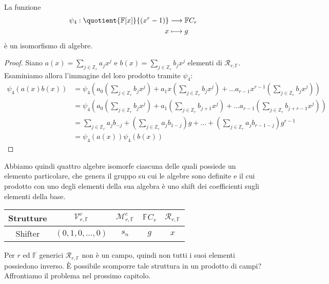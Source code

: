\begin{prop}
La funzione
\begin{align*}
\psi_{4}: \quotient{ \mathbb{F}[x] }{ (x^r -1 )} 
          &\longrightarrow  
          \mathbb{F}C_{r} \\
              x 
              &\longmapsto 
              g
\end{align*}
è un isomorfismo di algebre.
\end{prop}

\begin{proof}
Siano $a(x) = \sum_{j \in \mathbb{Z}_{r} }a_{j} x^{j}$ e $b(x)= \sum_{j \in
\mathbb{Z}_{r} } b_{j} x^{j}$ elementi di $\mathcal{R}_{r, \mathbb{F}} $.
Esaminiamo allora l'immagine del loro prodotto tramite $\psi_{4}$:
\begin{align*}
\psi_{4}(a(x)b(x)) 
&= \psi_{4}( 
a_{0}(\sum_{j \in \mathbb{Z}_{r} } b_{j} x^{j}) +  
a_{1}x(\sum_{j \in \mathbb{Z}_{r} } b_{j} x^{j}) +
\dots
a_{r-1}x^{r-1}(\sum_{j \in \mathbb{Z}_{r} } b_{j} x^{j})
)
\\
&= 
\psi_{4}( 
a_{0}(\sum_{j \in \mathbb{Z}_{r} } b_{j} x^{j}) +  
a_{1}(\sum_{j \in \mathbb{Z}_{r} } b_{j+1} x^{j}) +
\dots
a_{r-1}(\sum_{j \in \mathbb{Z}_{r} } b_{j+r-1} x^{j})
) 
\\
&=
\sum_{j \in \mathbb{Z}_{r} } a_{j} b_{-j} +
(\sum_{j \in \mathbb{Z}_{r} } a_{j} b_{1-j})g +
\dots +
(\sum_{j \in \mathbb{Z}_{r} } a_{j} b_{r-1-j})g^{r-1}
\\
&=
\psi_{4}(a(x))\psi_{4}(b(x))
\end{align*}
\end{proof}

Abbiamo quindi quattro algebre isomorfe ciascuna delle quali possiede un
elemento particolare, che genera il gruppo su cui le algebre sono definite e il
cui prodotto con uno degli elementi della sua algebra è uno shift dei coefficienti sugli elementi della base.
\begin{center}
\begin{tabular}{ c | c c c c }
Strutture 
& 
$\mathcal{V}_{r, \mathbb{F}}^{c}$ 
& 
$\mathcal{M}_{r,\mathbb{F} }^{c} $ 
& 
$\mathbb{F}C_{r} $ 
& 
$\mathcal{R}_{r, \mathbb{F}} $ 
\\
\hline
Shifter & $(0,1,0,\dots,0)$ & $s_n$ & $g$ & $x$ 
\end{tabular}
\end{center}
Per $r$ ed $\mathbb{F}$ generici $\mathcal{R}_{r, \mathbb{F}} $ non è un campo,
quindi non tutti i suoi elementi possiedono inverso. È possibile scomporre
tale struttura in un prodotto di campi? 
Affrontiamo il problema nel prossimo capitolo.


